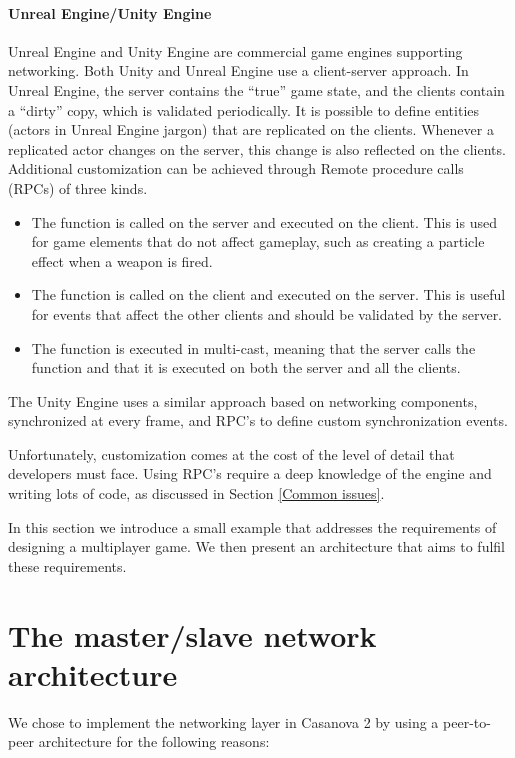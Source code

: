 \paragraph{Unreal Engine/Unity Engine} Unreal Engine \cite{games2006unreal} and Unity Engine \cite{engine9unity} are commercial game engines supporting networking.  Both Unity and Unreal Engine use a client-server approach. In Unreal Engine, the server contains the ``true'' game state, and the clients contain a ``dirty'' copy, which is validated periodically. It is possible to define entities (actors in Unreal Engine jargon) that are replicated on the clients. Whenever a replicated actor changes on the server, this change is also reflected on the clients. Additional customization can be achieved through Remote procedure calls (RPCs) of three kinds.
\begin{itemize}
	\item The function is called on the server and executed on the client. This is used for game elements that do not affect gameplay, such as creating a particle effect when a weapon is fired.
	\item The function is called on the client and executed on the server. This is useful for events that affect the other clients and should be validated by the server.
	\item The function is executed in multi-cast, meaning that the server calls the function and that it is executed on both the server and all the clients.
\end{itemize}

The Unity Engine uses a similar approach based on networking components, synchronized at every frame, and RPC's to define custom synchronization events.

Unfortunately, customization comes at the cost of the level of detail that developers must face. Using RPC's require a deep knowledge of the engine and writing lots of code, as discussed in Section \ref{Common issues}.

In this section we introduce a small example that addresses the requirements of designing a multiplayer game. We then present an architecture that aims to fulfil these requirements.

\section{The master/slave network architecture}

We chose to implement the networking layer in Casanova 2 by using a peer-to-peer architecture for the following reasons:

